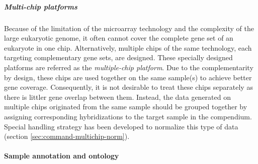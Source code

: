 \subparagraph{Multi-chip platforms}\label{sec:command-multichip-anno}
Because of the limitation of the microarray technology and the complexity of
the large eukaryotic genome, it often cannot cover the complete gene set of an
eukaryote in one chip.
%
Alternatively, multiple chips of the same technology, each targeting
complementary gene sets, are designed.
%
These specially designed platforms are referred as the \textit{multiple-chip
  platform}.
%
Due to the complementarity by design, these chips are used together on the
same sample(s) to achieve better gene coverage.
%
Consequently, it is not desirable to treat these chips separately as there is
littler gene overlap between them.
%
Instead, the data generated on multiple chips originated from the same sample
should be grouped together by assigning corresponding hybridizations to the
target sample in the compendium.
%
Special handling strategy has been developed to normalize this type of data
(section \ref{sec:command-multichip-norm}).






\paragraph{Sample annotation and ontology}

